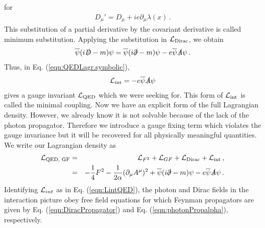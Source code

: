 for
\begin{eqnarray}
D_\mu' = D_\mu + ie \partial_\mu \lambda(x) \,.
\end{eqnarray}
This substitution of a partial derivative by the covariant derivative
is called minimum substitution.
Applying the substitution in ${\cal L}_{\mbox{\scriptsize Dirac}}$,
we obtain
\begin{eqnarray}
 \overline{\psi}(i \slashed{D} - m) \psi 
= 
 \overline{\psi}(i \slashed{\partial} - m) \psi 
- e  \overline{\psi} \slashed{A} \psi \,.
\end{eqnarray}
Thus, in Eq. (\ref{eqn:QEDLagr.symbolic}),
\begin{eqnarray}
{\cal L}_{\mbox{\scriptsize int}}
= 
- e  \overline{\psi} \slashed{A} \psi
\label{eqn:LintQED}
\end{eqnarray}
gives a gauge invariant ${\cal L}_{\mbox{\scriptsize QED}}$
which we were seeking for.
This form of ${\cal L}_{\mbox{\scriptsize int}}$ is called
the minimal coupling.
Now we have an explicit form of the full Lagrangian density.
However, we already know it is not solvable because
of the lack of the photon propagator.
Therefore we introduce a gauge fixing term which
violates the gauge invariance but it will be recovered 
for all physically meaningful quantities.
We write our Lagrangian density as
\begin{eqnarray}
{\cal L}_{\mbox{\scriptsize QED, GF}}
 &=& 
{\cal L}_{{\scriptsize F^2}}
+ 
{\cal L}_{{\scriptsize GF}}
+ 
{\cal L}_{\mbox{\scriptsize Dirac}}
+ 
{\cal L}_{\mbox{\scriptsize int}}\,,
\nonumber\\
 &=& 
-\frac{1}{4} F^2
-\frac{1}{2\alpha} (\partial_\mu A^\mu)^2
+ \overline{\psi}(i \slashed{\partial} - m) \psi
- e \overline{\psi} \slashed{A} \psi \,.
\label{eqn:QEDLagr.w.GF}
\end{eqnarray}
Identifying ${\cal L}_{int}$ as in Eq. (\ref{eqn:LintQED}),
the photon and Dirac fields in the interaction picture obey 
free field equations for which Feynman propagators are
given by
Eq. (\ref{eqn:DiracPropagator}) and Eq. (\ref{eqn:photonPropalpha}),
respectively.


